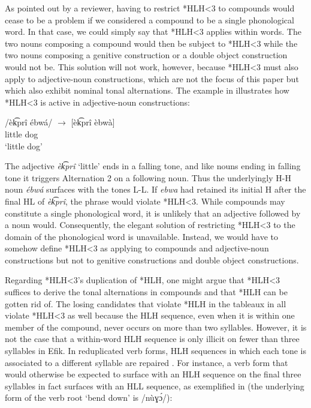 \documentclass[output=paper]{langscibook}
\begin{document}
As pointed out by a reviewer, having to restrict *HLH<3 to compounds would cease to be a problem if we considered a compound to be a single phonological word. In that case, we could simply say that *HLH<3 applies within words. The two nouns composing a compound would then be subject to *HLH<3 while the two nouns composing a genitive construction or a double object construction would not be. This solution will not work, however, because *HLH<3 must also apply to adjective-noun constructions, which are not the focus of this paper but which also exhibit nominal tonal alternations.  The example in  illustrates how *HLH<3 is active in adjective-noun constructions:

\ea\label{ex:glewwe:8} 
\gll /èk͡prî  ébwá/  ${\rightarrow}$  [èk͡prî èbwà]\\ 
     little dog\\
\glt ‘little dog’
\z

The adjective \textit{èk͡prî} ‘little’ ends in a falling tone, and like nouns ending in falling tone it triggers Alternation 2 on a following noun. Thus the underlyingly H-H noun \textit{ébwá} surfaces with the tones L-L. If \textit{ebwa} had retained its initial H after the final HL of \textit{èk͡prî}, the phrase would violate *HLH<3. While compounds may constitute a single phonological word, it is unlikely that an adjective followed by a noun would. Consequently, the elegant solution of restricting *HLH<3 to the domain of the phonological word is unavailable. Instead, we would have to somehow define *HLH<3 as applying to compounds and adjective-noun constructions but not to genitive constructions and double object constructions.   

Regarding *HLH<3’s duplication of *HLH, one might argue that *HLH<3 suffices to derive the tonal alternations in compounds and that *HLH can be gotten rid of. The losing candidates that violate *HLH in the tableaux in  all violate *HLH<3 as well because the HLH sequence, even when it is within one member of the compound, never occurs on more than two syllables. However, it is not the case that a within-word HLH sequence is only illicit on fewer than three syllables in Efik. In reduplicated verb forms, HLH sequences in which each tone is associated to a different syllable are repaired \citep{Glewwe2017}. For instance, a verb form that would otherwise be expected to surface with an HLH sequence on the final three syllables in fact surfaces with an HLL sequence, as exemplified in  (the underlying form of the verb root ‘bend down’ is /nùɣɔ́/):
\end{document}
